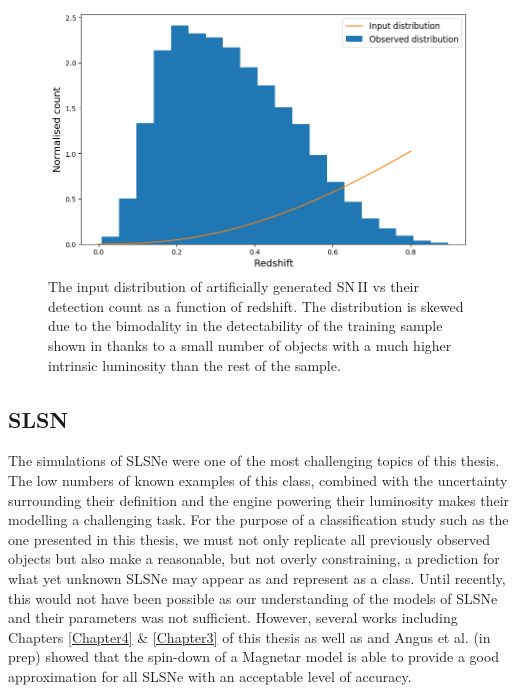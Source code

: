 \begin{figure}
  \includegraphics[width=\textwidth]{Figures/Chapter5/SNII_z_dist.png}
  \caption{The input distribution of artificially generated SN\,II vs their detection count as a function of redshift. The distribution is skewed due to the bimodality in the detectability of the training sample shown in  thanks to a small number of objects with a much higher intrinsic luminosity than the rest of the sample.}
  \label{fig:IIDist}
\end{figure}

\subsection{SLSN}
The simulations of SLSNe were one of the most challenging topics of this thesis. The low numbers of known examples of this class, combined with the uncertainty surrounding their definition and the engine powering their luminosity makes their modelling a challenging task. For the purpose of a classification study such as the one presented in this thesis, we must not only replicate all previously observed objects but also make a reasonable, but not overly constraining, a prediction for what yet unknown SLSNe may appear as and represent as a class. Until recently, this would not have been possible as our understanding of the models of SLSNe and their parameters was not sufficient. However, several works including Chapters \ref{Chapter4} \& \ref{Chapter3} of this thesis as well as \citet{Inserra2013,Nicholl2013,Nicholl2017} and Angus et al. (in prep) showed that the spin-down of a Magnetar model is able to provide a good approximation for all SLSNe with an acceptable level of accuracy.

